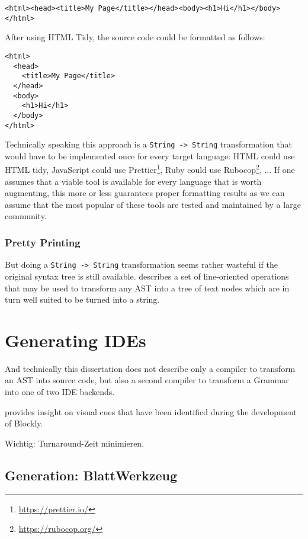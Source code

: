 \begin{verbatim}
<html><head><title>My Page</title></head><body><h1>Hi</h1></body></html>
\end{verbatim}

After using HTML Tidy, the source code could be formatted as follows:

\begin{verbatim}
<html>
  <head>
    <title>My Page</title>
  </head>
  <body>
    <h1>Hi</h1>
  </body>
</html>
\end{verbatim}

Technically speaking this approach is a \texttt{String -> String} transformation that would have to be implemented once for every target language: HTML could use HTML tidy, JavaScript could use Prettier\footnote{\url{https://prettier.io/}}, Ruby could use Rubocop\footnote{\url{https://rubocop.org/}}, ... If one assumes that a viable tool is available for every language that is worth augmenting, this more or less guarantees proper formatting results as we can assume that the most popular of these tools are tested and maintained by a large community.

\subsubsection{Pretty Printing}

But doing a \texttt{String -> String} transformation seems rather wasteful if the original syntax tree is still available. \cite{wadler_prettier_printer} describes a set of line-oriented operations that may be used to transform any AST into a tree of text nodes which are in turn well suited to be turned into a string.

\section{Generating IDEs}

And technically this dissertation does not describe only a compiler to transform an AST into source code, but also a second compiler to transform a Grammar into one of two IDE backends.

\cite{fraser_ten_2015} provides insight on visual cues that have been identified during the development of Blockly.

Wichtig: Turnaround-Zeit minimieren.

\subsection{Generation: BlattWerkzeug}

